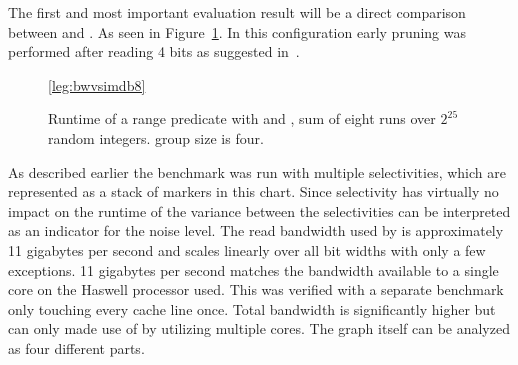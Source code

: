 The first and most important evaluation result will be a direct comparison
between \simdscan{} and \bwv{}. As seen in Figure~\ref{fig:eval:bwvsimdb8}. In
this configuration early pruning was performed after reading 4 bits as
suggested in~\cite{BitWeaving}.

\begin{figure}[h]
\pgfplotsset{footnotesize,width=0.75*\textwidth,height=6cm,compat=1.8}
\begin{center}

\ref*{leg:bwvsimdb8}
\end{center}
\caption{Runtime of a range predicate with \simdscan{} and \bwv{}, sum of eight
runs over $2^{25}$ random integers. \bwv{} group size is four.}
\label{fig:eval:bwvsimdb8}
\end{figure}

As described earlier the benchmark was run with multiple selectivities, which
are represented as a stack of markers in this chart. Since selectivity has
virtually no impact on the runtime of \simdscan{} the variance between the
selectivities can be interpreted as an indicator for the noise level. The read
bandwidth used by \simdscan{} is approximately 11 gigabytes per second and
scales linearly over all bit widths with only a few exceptions. 11 gigabytes
per second matches the bandwidth available to a single core on the Haswell
processor used. This was verified with a separate benchmark only touching every
cache line once. Total bandwidth is significantly higher but can only made use
of by utilizing multiple cores. The graph itself can be analyzed as four
different parts.

